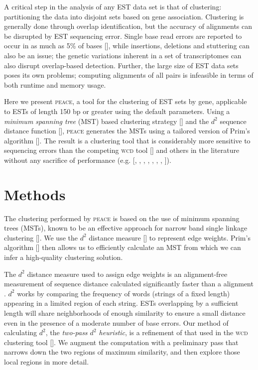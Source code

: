 \documentclass{bioinfo}
\begin{document}
A critical step in the analysis of any EST data set is that of
clustering: partitioning the data into disjoint sets based on gene
association.  Clustering is generally done through overlap
identification, but the accuracy of alignments can be disrupted by EST
sequencing error.  Single base read errors are reported to occur in as
much as 5\% of bases [\cite{Nagaraj07}], while insertions, deletions and stuttering can
also be an issue; the genetic variations inherent in a set of transcriptomes 
can also disrupt overlap-based detection.  Further, the large size of
EST data sets poses its own problems; computing alignments of all
pairs is infeasible in terms of both runtime and memory usage.

Here we present \textsc{peace}, a tool for the clustering of EST sets
by gene, applicable to ESTs of length 150 bp or greater using the
default parameters.  Using a {\it minimum spanning tree} (MST) based
clustering strategy [\cite{Jain99,Wan08}] and the $d^2$ sequence
distance function [\cite{Hide94}], \textsc{peace} generates
the MSTs using a tailored version of Prim's algorithm [\cite{Prim57}].
The result is a clustering tool that is considerably more sensitive to
sequencing errors than the competing \textsc{wcd} tool
[\cite{Hazelhurst08a}] and others in the literature without any
sacrifice of performance (e.g. [\cite{Burke99}, \cite{Slater00},
\cite{Huang99}, \cite{Parkinson02}, \cite{Kalyanaraman03},
\cite{Malde03}, \cite{Ptitsyn05}, \cite{Picardi09}]).

\section {Methods}

The clustering performed by \textsc{peace} is based on the use of minimum
spanning trees (MSTs), known to be an effective approach for narrow
band single linkage clustering [\cite{Jain99,Wan08}]. We use the $d^2$
distance measure [\cite{Hide94}] to represent edge weights.  Prim's
algorithm [\cite{Prim57}] then allows us to efficiently calculate an
MST from which we can infer a high-quality clustering solution.

The $d^2$ distance measure used to assign edge weights is an
alignment-free measurement of sequence distance calculated
significantly faster than a alignment \cite{Hide94,Foret09}.  $d^2$
works by comparing the frequency of words (strings of a fixed length)
appearing in a limited region of each string.  ESTs overlapping by a
sufficient length will share neighborhoods of enough similarity to
ensure a small distance even in the presence of a moderate number of
base errors.  Our method of calculating $d^2$, the {\it two-pass $d^2$
  heuristic}, is a refinement of that used in the \textsc{wcd}
clustering tool [\cite{Hazelhurst08a}].  We augment the computation
with a preliminary pass that narrows down the two regions of maximum
similarity, and then explore those local regions in more detail.
\end{document}
